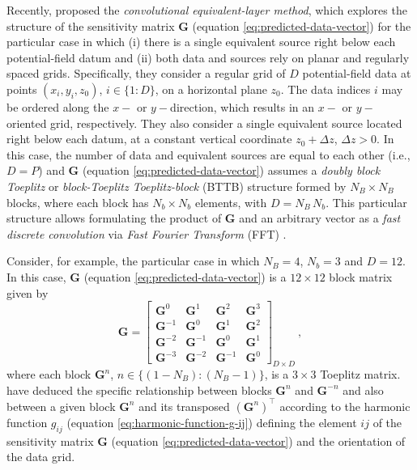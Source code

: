 Recently, \citet{takahashi-etal2020,takahashi-etal2022} proposed the \textit{convolutional equivalent-layer method}, 
which explores the structure of the sensitivity matrix $\mathbf{G}$ (equation \ref{eq:predicted-data-vector}) for 
the particular case in which (i) there is a single equivalent source right below each potential-field
datum and (ii) both data and sources rely on planar and regularly spaced grids.
Specifically, they consider a regular grid of $D$ 
potential-field data at points $(x_{i}, y_{i}, z_{0})$, $i \in \{1:D\}$, on a horizontal plane $z_{0}$.
The data indices $i$ may be ordered along the $x-$ or $y-$direction, which results in an
$x-$ or $y-$oriented grid, respectively.
They also consider a single equivalent source located right below each datum, at a constant vertical coordinate
$z_{0} + \Delta z$, $\Delta z > 0$.
In this case, the number of data and equivalent sources are equal to each other (i.e., $D = P$) and
$\mathbf{G}$ (equation \ref{eq:predicted-data-vector}) assumes a \textit{doubly block Toeplitz} \cite[][p. 28]{jain1989} or 
\textit{block-Toeplitz Toeplitz-block} (BTTB) \cite[][p. 67]{chan-jin2007} structure formed by $N_{B} \times N_{B}$
blocks, where each block has $N_{b} \times N_{b}$ elements, with $D = N_{B} \, N_{b}$.
This particular structure allows formulating the product
of $\mathbf{G}$ and an arbitrary vector as a \textit{fast discrete convolution} via 
\textit{Fast Fourier Transform} (FFT) \cite[][section 4.2]{vanloan1992}.

Consider, for example, the particular case in which $N_{B} = 4$, $N_{b} = 3$ and $D = 12$. In this case,
$\mathbf{G}$ (equation \ref{eq:predicted-data-vector}) is a $12 \times 12$ block matrix given by
\begin{equation}
	\mathbf{G} = \begin{bmatrix}
		\mathbf{G}^{0} & \mathbf{G}^{1} & \mathbf{G}^{2} & \mathbf{G}^{3} \\
		\mathbf{G}^{-1} & \mathbf{G}^{0} & \mathbf{G}^{1} & \mathbf{G}^{2} \\
		\mathbf{G}^{-2} & \mathbf{G}^{-1} & \mathbf{G}^{0} & \mathbf{G}^{1} \\
		\mathbf{G}^{-3} & \mathbf{G}^{-2} & \mathbf{G}^{-1} & \mathbf{G}^{0}
	\end{bmatrix}_{D \times D} \: ,
	\label{eq:matrix-G-BTTB}
\end{equation}
where each block $\mathbf{G}^{n}$, $n \in \{ (1 - N_{B}) : (N_{B} - 1) \}$, is a $3 \times 3$ Toeplitz matrix.
\citet{takahashi-etal2020, takahashi-etal2022} have deduced the specific relationship between blocks $\mathbf{G}^{n}$
and $\mathbf{G}^{-n}$ and also between a given block $\mathbf{G}^{n}$ and its transposed $\left(\mathbf{G}^{n}\right)^{\top}$
according to the harmonic function $g_{ij}$ (equation \ref{eq:harmonic-function-g-ij}) defining the element $ij$ of
the sensitivity matrix $\mathbf{G}$ (equation \ref{eq:predicted-data-vector}) and the orientation of the data grid.

